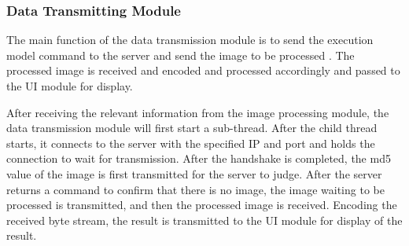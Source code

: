 \subsubsection{Data Transmitting Module}

The main function of the data transmission module is to send the execution model command to the server and send the image to be processed \cite{rhodes2014foundations}. The processed image is received and encoded and processed accordingly and passed to the UI module for display.



After receiving the relevant information from the image processing module, the data transmission module will first start a sub-thread. After the child thread starts, it connects to the server with the specified IP and port and holds the connection to wait for transmission. After the handshake is completed, the md5 value of the image is first transmitted for the server to judge. After the server returns a command to confirm that there is no image, the image waiting to be processed is transmitted, and then the processed image is received. Encoding the received byte stream, the result is transmitted to the UI module for display of the result.




